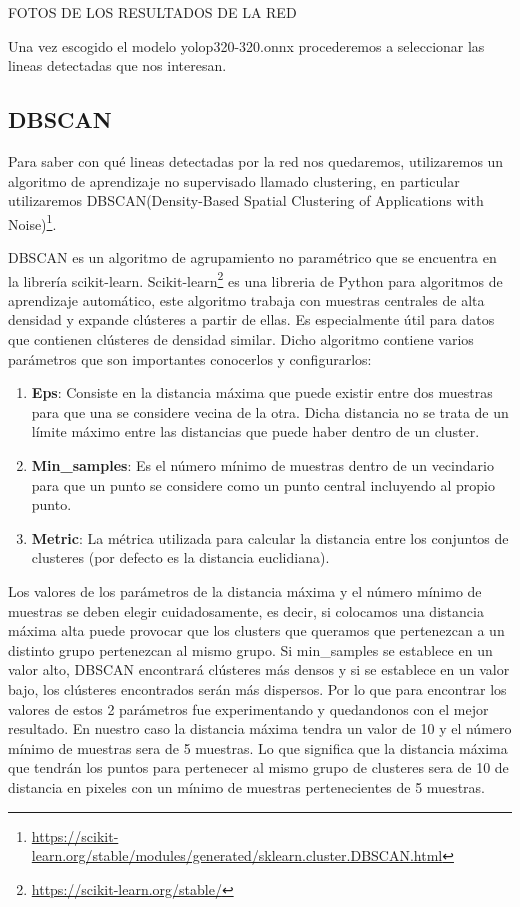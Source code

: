 FOTOS DE LOS RESULTADOS DE LA RED



Una vez escogido el modelo yolop320-320.onnx procederemos a seleccionar las lineas detectadas que nos interesan.

\subsection{DBSCAN}
\label{sec:DBSCAN}

Para saber con qué lineas detectadas por la red nos quedaremos, utilizaremos un algoritmo de aprendizaje no supervisado llamado clustering, en particular
utilizaremos DBSCAN(Density-Based Spatial Clustering of Applications with Noise)\footnote{\url{https://scikit-learn.org/stable/modules/generated/sklearn.cluster.DBSCAN.html}}. 

DBSCAN es un algoritmo de agrupamiento no paramétrico que se encuentra en la librería scikit-learn. Scikit-learn\footnote{\url{https://scikit-learn.org/stable/}} es una libreria de Python para algoritmos de aprendizaje automático,
este algoritmo trabaja con muestras centrales de alta densidad y expande clústeres a partir de ellas. Es especialmente útil para datos que contienen clústeres de densidad similar.
\newline
Dicho algoritmo contiene varios parámetros que son importantes conocerlos y configurarlos: 
\begin{enumerate}
  \item \textbf{Eps}: Consiste en la distancia máxima que puede existir entre dos muestras para que una se considere vecina de la otra. Dicha distancia no se trata de un límite 
  máximo entre las distancias que puede haber dentro de un cluster.
  \item \textbf{Min\_samples}: Es el número mínimo de muestras dentro de un vecindario para que un punto se considere como un punto central incluyendo al propio punto.
  \item \textbf{Metric}: La métrica utilizada para calcular la distancia entre los conjuntos de clusteres (por defecto es la distancia euclidiana). 
\end{enumerate}
Los valores de los parámetros de la distancia máxima y el número mínimo de muestras se deben elegir cuidadosamente, es decir, si colocamos una distancia 
máxima alta puede provocar que los clusters que queramos que pertenezcan a un distinto grupo pertenezcan al mismo grupo. 
Si min\_samples se establece en un valor alto, DBSCAN encontrará clústeres más densos y 
si se establece en un valor bajo, los clústeres encontrados serán más dispersos.
\break
Por lo que para encontrar los valores de estos 2 parámetros fue experimentando y quedandonos con el mejor resultado. En nuestro caso la distancia máxima tendra un valor de 10 
y el número mínimo de muestras sera de 5 muestras. Lo que significa que la distancia máxima que tendrán los puntos para pertenecer al mismo grupo de clusteres sera de 10 de distancia en pixeles
con un mínimo de muestras pertenecientes de 5 muestras. 

